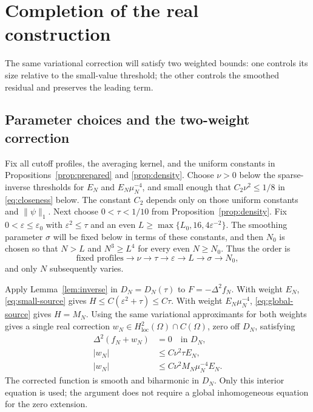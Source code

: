 \documentclass[11pt,twoside,leqno]{article}
\numberwithin{equation}{section}
\theoremstyle{definition}
\theoremstyle{remark}
\newcommand{\loc}{\mathrm{loc}}
\newcommand{\eps}{\varepsilon}
\newcommand{\Om}{\Omega}
\begin{document}
\section{Completion of the real construction}\label{sec:completion}

The same variational correction will satisfy two weighted bounds:
one controls its size relative to the small-value threshold; the other
controls the smoothed residual and preserves the leading term.

\subsection{Parameter choices and the two-weight correction}

Fix all cutoff profiles, the averaging kernel, and the uniform constants
in Propositions~\ref{prop:prepared} and \ref{prop:density}.
Choose $\nu>0$ below the sparse-inverse thresholds for $E_N$ and
$E_N\mu_N^{-4}$, and small enough that $C_2\nu^2\le1/8$ in
\eqref{eq:closeness} below. The constant $C_2$ depends only on those
uniform constants and $\|\psi\|_1$.
Next choose $0<\tau<1/10$ from Proposition~\ref{prop:density}.
Fix $0<\eps\le\eps_0$ with $\eps^2\le\tau$ and an even
$L\ge\max\{L_0,16,4\eps^{-2}\}$.
The smoothing parameter $\sigma$ will be fixed below in terms of these
constants, and then $N_0$ is chosen so that $N>L$ and $N^3\ge L^4$
for every even $N\ge N_0$. Thus the order is
\[
 \text{fixed profiles}\longrightarrow\nu\longrightarrow\tau
 \longrightarrow\eps\longrightarrow L\longrightarrow\sigma
 \longrightarrow N_0,
\]
and only $N$ subsequently varies.

Apply Lemma~\ref{lem:inverse} in $D_N=D_N(\tau)$ to
$F=-\Delta^2f_N$. With weight $E_N$, \eqref{eq:small-source}
gives $H\le C(\eps^2+\tau)\le C\tau$.
With weight $E_N\mu_N^{-4}$, \eqref{eq:global-source} gives $H=M_N$.
Using the same variational approximants for both weights gives a single
real correction $w_N\in H^2_{\loc}(\Om)\cap C(\Om)$, zero off $D_N$,
satisfying
\begin{align}
 \Delta^2(f_N+w_N)&=0\quad\text{in }D_N,\nonumber\\
 |w_N|&\le C\nu^2\tau E_N,                         \label{eq:correction-small}\\
 |w_N|&\le C\nu^2M_N\mu_N^{-4}E_N.                 \label{eq:correction-order}
\end{align}
The corrected function is smooth and biharmonic in $D_N$.
Only this interior equation is used; the argument does not require a
global inhomogeneous equation for the zero extension.
\end{document}

